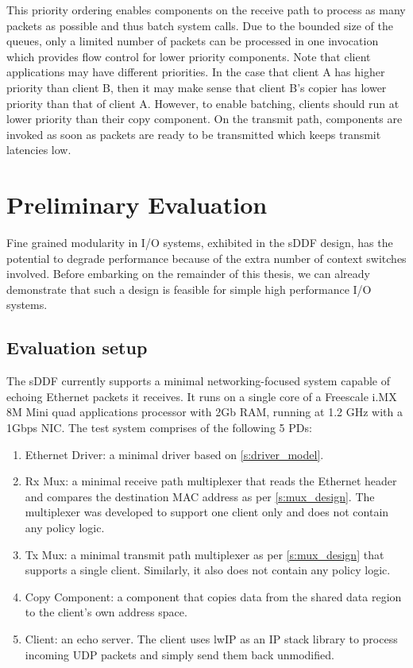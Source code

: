 This priority ordering enables components on the receive path to process as many packets as possible and
thus batch system calls. Due to the bounded size of the queues, only a limited number of packets 
can be processed in one invocation which provides flow control for lower priority components. Note that
client applications may have different priorities. In the case that client A has higher priority
than client B, then it may make sense that client B's copier has lower priority than that of client A.
However, to enable batching, clients should run at lower priority than their copy component. 
On the transmit path, components are invoked as soon as packets are 
ready to be transmitted which keeps transmit latencies low.

\section{Preliminary Evaluation}

Fine grained modularity in I/O systems, exhibited in the sDDF design, has the
potential to degrade performance because of the extra number of context switches involved.
Before embarking on the remainder of this thesis, we can already demonstrate that such a
design is feasible for simple high performance I/O systems.

\subsection{Evaluation setup}
The sDDF currently supports a minimal networking-focused system capable of echoing Ethernet packets it receives. It
runs on a single core of a Freescale i.MX 8M Mini quad applications processor with 2Gb RAM, running at 1.2 GHz with a 1Gbps NIC.
The test system comprises of the following 5 PDs:
\begin{enumerate}
\item Ethernet Driver: a minimal driver based on \ref{s:driver_model}.
\item Rx Mux: a minimal receive path multiplexer that reads the Ethernet header and compares the
destination MAC address as per \ref{s:mux_design}.
The multiplexer was developed to support one client only and does not contain any policy logic. 
\item Tx Mux: a minimal transmit path multiplexer as per \ref{s:mux_design} that supports a single
client. Similarly, it also does not contain any policy logic.
\item Copy Component: a component that copies data from the shared data region to the client's own address space. 
\item Client: an echo server. The client uses lwIP \cite{Dunkels_01} as an IP stack library to process incoming 
UDP packets and simply send them back unmodified. 
\end{enumerate}

